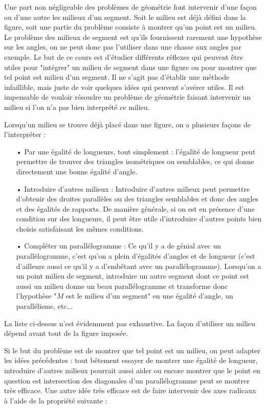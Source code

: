 Une part non négligeable des problèmes de géométrie font intervenir d'une façon ou d'une autre les milieux d'un segment. Soit le milieu est déjà défini dans la figure, soit une partie du problème consiste à montrer qu'un point est un milieu. Le problème des milieux de segment est qu'ils fournissent rarement une hypothèse sur les angles, on ne peut donc pas l'utiliser dans une chasse aux angles par exemple. Le but de ce cours est d'étudier différents réflexes qui peuvent être utiles pour "intégrer" un milieu de segment dans une figure ou pour montrer que tel point est milieu d'un segment. Il ne s'agit pas d'établir une méthode infaillible, mais juste de voir quelques idées qui peuvent s'avérer utiles. Il est impensable de vouloir résoudre un problème de géométrie faisant intervenir un milieu si l'on n'a pas bien interprété ce milieu.

Lorsqu'un milieu se trouve déjà placé dans une figure, on a plusieurs façons de l'interpréter :
\begin{itemize}
\item[•] Par une égalité de longueurs, tout simplement : l'égalité de longueur peut permettre de trouver des triangles isométriques ou semblables, ce qui donne directement une bonne égalité d'angle.
\item[•] Introduire d'autres milieux :
Introduire d'autres milieux peut permettre d'obtenir des droites parallèles ou des triangles semblables et donc des angles et des égalités de rapports.
De manière générale, si on est en présence d'une condition sur des longueurs, il peut être utile d'introduire d'autres points bien choisis satisfaisant les mêmes conditions.
\item[•] Compléter un parallélogramme : Ce qu'il y a de génial avec un parallèlogramme, c'est qu'on a plein d'égalités d'angles et de longueur (c'est d'ailleurs aussi ce qu'il y a d'embêtant avec un parallélogramme). Lorsqu'on a un point milieu de segment, introduire un autre segment dont ce point est aussi un milieu donne un beau parallélogramme et transforme donc l'hypothèse "$M$ est le milieu d'un segment" en une égalité d'angle, un parallélisme, etc...
\end{itemize}
La liste ci-dessus n'est évidemment pas exhaustive. La façon d'utiliser un milieu dépend avant tout de la figure imposée.

Si le but du problème est de montrer que tel point est un milieu, on peut adapter les idées précédentes : tout bêtement essayer de montrer une égalité de longueur, introduire d'autres milieux pourrait aussi aider ou encore montrer que le point en question est intersection des diagonales d'un parallélogramme peut se montrer très efficace.
Une autre idée très efficace est de faire intervenir des axes radicaux à l'aide de la propriété suivante :


